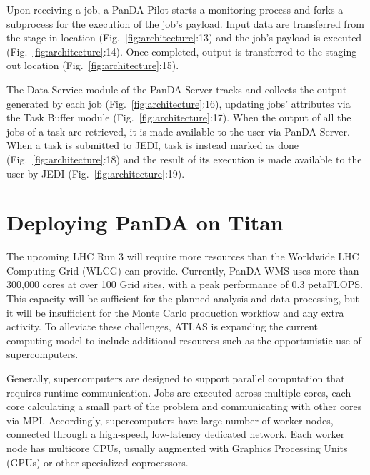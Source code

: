 \documentclass[conference]{IEEEtran}
\begin{document}
Upon receiving a job, a PanDA Pilot starts a monitoring process and forks a
subprocess for the execution of the job's payload. Input data are transferred
from the stage-in location (Fig.~\ref{fig:architecture}:13) and the job's
payload is executed (Fig.~\ref{fig:architecture}:14). Once completed, output is
transferred to the staging-out location (Fig.~\ref{fig:architecture}:15).

The Data Service module of the PanDA Server tracks and collects the output
generated by each job (Fig.~\ref{fig:architecture}:16), updating jobs'
attributes via the Task Buffer module (Fig.~\ref{fig:architecture}:17). When the
output of all the jobs of a task are retrieved, it is made available to the user
via PanDA Server. When a task is submitted to JEDI, task is instead marked as
done (Fig.~\ref{fig:architecture}:18) and the result of its execution is made
available to the user by JEDI (Fig.~\ref{fig:architecture}:19).


\section{Deploying PanDA on Titan}
\label{sec:panda_titan}

The upcoming LHC Run 3 will require more resources than the Worldwide LHC
Computing Grid (WLCG) can provide. Currently, PanDA WMS uses more than 300,000
cores at over 100 Grid sites, with a peak performance of 0.3 petaFLOPS. This
capacity will be sufficient for the planned analysis and data processing, but it
will be insufficient for the Monte Carlo production workflow and any extra
activity. To alleviate these challenges, ATLAS is expanding the current
computing model to include additional resources such as the opportunistic use of
supercomputers.

Generally, supercomputers are designed to support parallel computation that
requires runtime communication. Jobs are executed across multiple cores, each
core calculating a small part of the problem and communicating with other cores
via MPI. Accordingly, supercomputers have large number of worker nodes,
connected through a high-speed, low-latency dedicated network. Each worker node
has multicore CPUs, usually augmented with Graphics Processing Units (GPUs) or
other specialized coprocessors.
\end{document}
